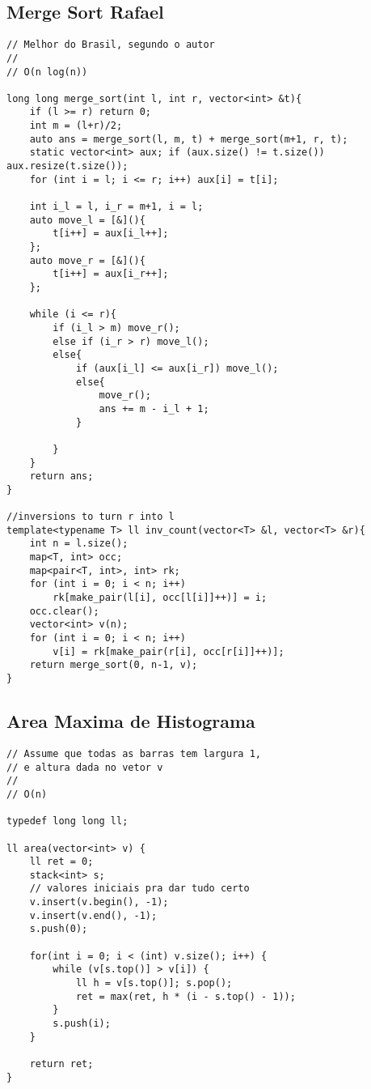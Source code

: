 \documentclass[12pt, a4paper, twoside]{article}
\begin{document}
\subsection{Merge Sort Rafael}
\begin{lstlisting}
// Melhor do Brasil, segundo o autor
//
// O(n log(n))

long long merge_sort(int l, int r, vector<int> &t){
	if (l >= r) return 0;
	int m = (l+r)/2;
	auto ans = merge_sort(l, m, t) + merge_sort(m+1, r, t);
	static vector<int> aux; if (aux.size() != t.size()) aux.resize(t.size());
	for (int i = l; i <= r; i++) aux[i] = t[i];

	int i_l = l, i_r = m+1, i = l;
	auto move_l = [&](){
		t[i++] = aux[i_l++];
	};
	auto move_r = [&](){
		t[i++] = aux[i_r++];
	};

	while (i <= r){
		if (i_l > m) move_r();
		else if (i_r > r) move_l();
		else{
			if (aux[i_l] <= aux[i_r]) move_l();
			else{
				move_r();
				ans += m - i_l + 1;
			}

		}
	}
	return ans;
}

//inversions to turn r into l
template<typename T> ll inv_count(vector<T> &l, vector<T> &r){
	int n = l.size();
	map<T, int> occ;
	map<pair<T, int>, int> rk;
	for (int i = 0; i < n; i++)
		rk[make_pair(l[i], occ[l[i]]++)] = i;
	occ.clear();
	vector<int> v(n);
	for (int i = 0; i < n; i++)
		v[i] = rk[make_pair(r[i], occ[r[i]]++)];
	return merge_sort(0, n-1, v);
}
\end{lstlisting}

\subsection{Area Maxima de Histograma}
\begin{lstlisting}
// Assume que todas as barras tem largura 1,
// e altura dada no vetor v
//
// O(n)

typedef long long ll;

ll area(vector<int> v) {
	ll ret = 0;
	stack<int> s;
	// valores iniciais pra dar tudo certo
	v.insert(v.begin(), -1);
	v.insert(v.end(), -1);
	s.push(0);

	for(int i = 0; i < (int) v.size(); i++) {
		while (v[s.top()] > v[i]) {
			ll h = v[s.top()]; s.pop();
			ret = max(ret, h * (i - s.top() - 1));
		}
		s.push(i);
	}
  
	return ret;
}
\end{lstlisting}
\end{document}
